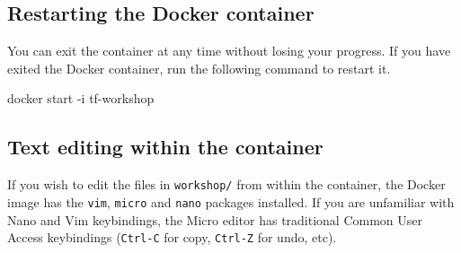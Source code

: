 \subsection{Restarting the Docker container}
You can exit the container at any time without losing your progress.
If you have exited the Docker container, run the following command to restart it.
\begin{shell}
docker start -i tf-workshop
\end{shell}

\subsection{Text editing within the container}
If you wish to edit the files in \texttt{workshop/} from within the container,
the Docker image has the \texttt{vim}, \texttt{micro} and \texttt{nano} packages installed.
If you are unfamiliar with Nano and Vim keybindings, the Micro editor
has traditional Common User Access keybindings (\texttt{Ctrl-C} for copy,
\texttt{Ctrl-Z} for undo, etc).
